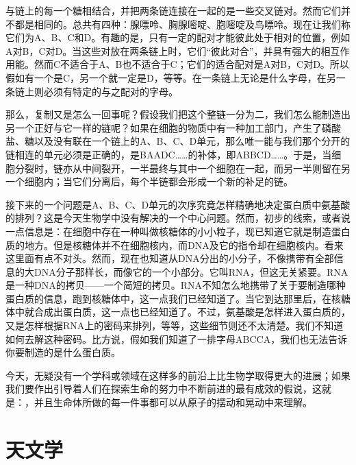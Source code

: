 与链上的每一个糖相结合，并把两条链连接在一起的是一些交叉链对。然而它们并不都是相同的。总共有四种：腺嘌呤、胸腺嘧啶、胞嘧啶及鸟嘌呤。现在让我们称它们为A、B、C和D。有趣的是，只有一定的配对才能彼此处于相对的位置，例如A对B，C对D。当这些对放在两条链上时，它们“彼此对合”，并具有强大的相互作用能。然而C不适合于A、B也不适合于C；它们的适合配对是A对B，C对D。所以假如有一个是C，另一个就一定是D，等等。在一条链上无论是什么字母，在另一条链上则必须有特定的与之配对的字母。

那么，复制又是怎么一回事呢？假设我们把这个整链一分为二，我们怎么能制造出另一个正好与它一样的链呢？如果在细胞的物质中有一种加工部门，产生了磷酸盐、糖以及没有联在一个链上的A、B、C、D单元，那么唯一能与我们那个分开的链相连的单元必须是正确的，是BAADC……的补体，即ABBCD……。于是，当细胞分裂时，链亦从中间裂开，一半最终与其中一个细胞在一起，而另一半则留在另一个细胞内；当它们分离后，每个半链都会形成一个新的补足的链。

接下来的一个问题是A、B、C、D单元的次序究竟怎样精确地决定蛋白质中氨基酸的排列？这是今天生物学中没有解决的一个中心问题。然而，初步的线索，或者说一点信息是：在细胞中存在一种叫做核糖体的小小粒子，现已知道它就是制造蛋白质的地方。但是核糖体并不在细胞核内，而DNA及它的指令却在细胞核内。看来这里面有点不对头。然而，现在也知道从DNA分出的小分子，不像携带有全部信息的大DNA分子那样长，而像它的一个小部分。它叫RNA，但这无关紧要。RNA是一种DNA的拷贝——一个简短的拷贝。RNA不知怎么地携带了关于要制造哪种蛋白质的信息，跑到核糖体中，这一点我们已经知道了。当它到达那里后，在核糖体中就合成出蛋白质，这一点也已经知道了。不过，氨基酸是怎样进入蛋白质的，又是怎样根据RNA上的密码来排列，等等，这些细节则还不太清楚。我们不知道如何去解这种密码。比方说，假如我们知道了一排字母ABCCA，我们也无法告诉你要制造的是什么蛋白质。

今天，无疑没有一个学科或领域在这样多的前沿上比生物学取得更大的进展；如果我们要作出引导着人们在探索生命的努力中不断前进的最有成效的假说，这就是：，并且生命体所做的每一件事都可以从原子的摆动和晃动中来理解。


\section{天文学}

